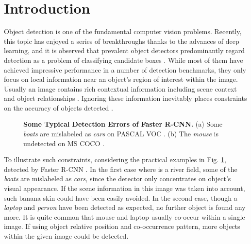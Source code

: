 \documentclass[10pt,twocolumn,letterpaper]{article}
\begin{document}
\vspace{-2ex}
\section{Introduction}

Object detection is one of the fundamental computer vision problems. Recently, this topic has enjoyed a series of breakthroughs thanks to the advances of deep learning, and it is observed that prevalent object detectors predominantly regard detection as a problem of classifying candidate boxes \cite{RCNN, Fast, Faster, FPN, RFCN}. While most of them have achieved impressive performance in a number of detection benchmarks, they only focus on local information near an object's region of interest within the image. Usually an image contains rich contextual information including scene context and object relationships \cite{AES}. Ignoring these information inevitably places constraints on the accuracy of objects detected \cite{ION}.

\begin{figure}[t]
\vspace{-1.5ex}
\hspace{-1ex}
\centering
{} 
 \hspace{-1ex}
\caption{{\bf Some Typical Detection Errors of Faster R-CNN.} (a) Some {\em boats} are mislabeled as {\em cars} on PASCAL VOC \cite{voc}. (b) The {\em mouse} is undetected on MS COCO \cite{coco}.}
\label{fig:errors}
\vspace{-2.5ex}
\end{figure}


To illustrate such constraints, considering the practical examples in Fig. \ref{fig:errors}, detected by Faster R-CNN \cite{Faster}. In the first case where is a river field, some of the {\em boats} are mislabeled as {\em cars}, since the detector only concentrates on object's visual appearance. If the scene information in this image was taken into account, such banana skin could have been easily avoided. In the second case, though a {\em laptop} and {\em person} have been detected as expected, no further object is found any more. It is quite common that mouse and laptop usually co-occur within a single image. If using object relative position and co-occurrence pattern, more objects within the given image could be detected.
\end{document}
